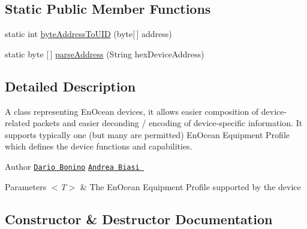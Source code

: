 \subsection*{Static Public Member Functions}
\begin{DoxyCompactItemize}
\item 
static int \hyperlink{classit_1_1polito_1_1elite_1_1enocean_1_1enj_1_1model_1_1_en_ocean_device_afb41c1bccce06b6c5a64e63b48d10470}{byte\+Address\+To\+U\+ID} (byte\mbox{[}$\,$\mbox{]} address)
\item 
static byte \mbox{[}$\,$\mbox{]} \hyperlink{classit_1_1polito_1_1elite_1_1enocean_1_1enj_1_1model_1_1_en_ocean_device_ada1db02dc3994a125199680940e69bb7}{parse\+Address} (String hex\+Device\+Address)
\end{DoxyCompactItemize}


\subsection{Detailed Description}
A class representing En\+Ocean devices, it allows easier composition of device-\/related packets and easier deconding / encoding of device-\/specific information. It supports typically one (but many are permitted) En\+Ocean Equipment Profile which defines the device functions and capabilities.

\begin{DoxyAuthor}{Author}
\href{mailto:dario.bonino@gmail.com}{\tt Dario Bonino}  \href{mailto:biasiandrea04@gmail.com}{\tt Andrea Biasi }
\end{DoxyAuthor}

\begin{DoxyParams}{Parameters}
{\em $<$\+T$>$} & The En\+Ocean Equipment Profile supported by the device \\
\hline
\end{DoxyParams}


\subsection{Constructor \& Destructor Documentation}
\hypertarget{classit_1_1polito_1_1elite_1_1enocean_1_1enj_1_1model_1_1_en_ocean_device_a28575e219842a0cae0dc387b38716bce}{}\label{classit_1_1polito_1_1elite_1_1enocean_1_1enj_1_1model_1_1_en_ocean_device_a28575e219842a0cae0dc387b38716bce} 

